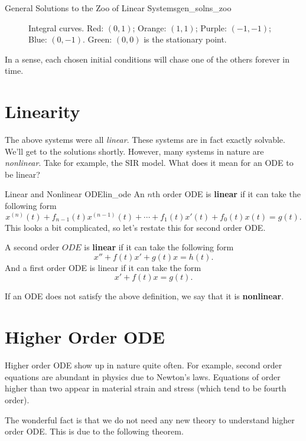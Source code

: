 \begin{ex}{General Solutions to the Zoo of Linear Systems}{gen_solns_zoo}
\begin{enumerate}[(I)]
\begin{figure}[H]
                \caption{Integral curves. Red: $(0,1)$; Orange: $(1,1)$; Purple: $(-1,-1)$; Blue: $(0,-1)$. Green: $(0,0)$ is the stationary point.}
                \label{fig:my_label}
            \end{figure}
            In a sense, each chosen initial conditions will chase one of the others forever in time.
        \end{enumerate}
        \end{ex}
        
        \section{Linearity}
        The above systems were all \emph{linear}.  These systems are in fact exactly solvable.  We'll get to the solutions shortly.  However, many systems in nature are \emph{nonlinear}.  Take for example, the SIR model. What does it mean for an ODE to be linear? 
        
        \begin{df}{Linear and Nonlinear ODE}{lin_ode}
        An $n$th order ODE is \textbf{linear} if it can take the following form
        \[
        x^{(n)}(t)+f_{n-1}(t)x^{(n-1)}(t)+\cdots + f_1(t)x'(t) +f_0(t)x(t)=g(t).
        \]
        This looks a bit complicated, so let's restate this for second order ODE.
        
        A second order $ODE$ is \textbf{linear} if it can take the following form
        \[
        x''+f(t)x'+g(t)x=h(t).
        \]
        And a first order ODE is linear if it can take the form
        \[
        x'+f(t)x=g(t).
        \]
        
        If an ODE does not satisfy the above definition, we say that it is \textbf{nonlinear}.
        \end{df}
        
        
        \section{Higher Order ODE}
        Higher order ODE show up in nature quite often.  For example, second order equations are abundant in physics due to Newton's laws.  Equations of order higher than two appear in material strain and stress (which tend to be fourth order).  
        
        The wonderful fact is that we do not need any new theory to understand higher order ODE.  This is due to the following theorem.
        
